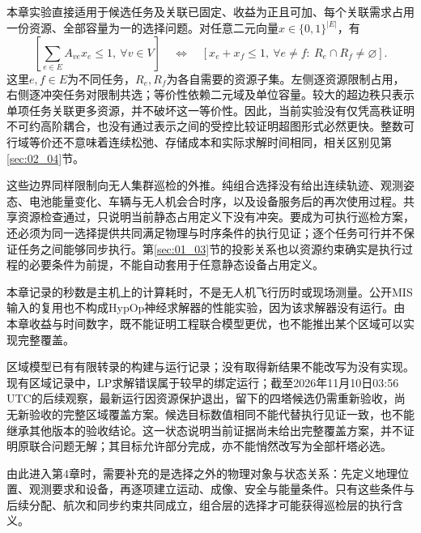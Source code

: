 本章实验直接适用于候选任务及关联已固定、收益为正且可加、每个关联需求占用一份资源、全部容量为一的选择问题。对任意二元向量$x\in\{0,1\}^{|E|}$，有
\begin{equation}
 \left[\sum_{e\in E}A_{ve}x_e\leq1,
       \ \forall v\in V\right]
 \quad\Longleftrightarrow\quad
 \left[x_e+x_f\leq1,
       \ \forall e\ne f:\ R_e\cap R_f\ne\varnothing\right].
 \label{s0308:unit_capacity_boundary}
\end{equation}
这里$e,f\in E$为不同任务，$R_e,R_f$为各自需要的资源子集。左侧逐资源限制占用，右侧逐冲突任务对限制共选；等价性依赖二元域及单位容量。较大的超边秩只表示单项任务关联更多资源，并不破坏这一等价性。因此，当前实验没有仅凭高秩证明不可约高阶耦合，也没有通过表示之间的受控比较证明超图形式必然更快。整数可行域等价还不意味着连续松弛、存储成本和实际求解时间相同，相关区别见第\ref{sec:02_04}节。

这些边界同样限制向无人集群巡检的外推。纯组合选择没有给出连续轨迹、观测姿态、电池能量变化、车辆与无人机会合时序，以及设备服务后的再次使用过程。共享资源检查通过，只说明当前静态占用定义下没有冲突。要成为可执行巡检方案，还必须为同一选择提供共同满足物理与时序条件的执行见证；逐个任务可行并不保证任务之间能够同步执行。第\ref{sec:01_03}节的投影关系也以资源约束确实是执行过程的必要条件为前提，不能自动套用于任意静态设备占用定义。

本章记录的秒数是主机上的计算耗时，不是无人机飞行历时或现场测量。公开MIS输入的复用也不构成HypOp神经求解器的性能实验，因为该求解器没有运行。由本章收益与时间数字，既不能证明工程联合模型更优，也不能推出某个区域可以实现完整覆盖。

区域模型已有有限转录的构建与运行记录；没有取得新结果不能改写为没有实现。现有区域记录中，LP求解错误属于较早的绑定运行；截至2026年11月10日03:56 UTC的后续观察，最新运行因资源保护退出，留下的四塔候选仍需重新验收，尚无新验收的完整区域覆盖方案。候选目标数值相同不能代替执行见证一致，也不能继承其他版本的验收结论。这一状态说明当前证据尚未给出完整覆盖方案，并不证明原联合问题无解；其目标允许部分完成，亦不能悄然改写为全部杆塔必选。

由此进入第4章时，需要补充的是选择之外的物理对象与状态关系：先定义地理位置、观测要求和设备，再逐项建立运动、成像、安全与能量条件。只有这些条件与后续分配、航次和同步约束共同成立，组合层的选择才可能获得巡检层的执行含义。
